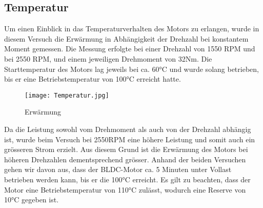 \subsection{Temperatur}\label{subsec:Temperatur}
Um einen Einblick in das Temperaturverhalten des Motors zu erlangen, wurde in diesem Versuch die Erwärmung in Abhängigkeit der Drehzahl bei konstantem Moment gemessen. Die Messung erfolgte bei einer Drehzahl von 1550 RPM und bei 2550 RPM, und einem jeweiligen Drehmoment von 32Nm. Die Starttemperatur des Motors lag jeweils bei ca. 60°C und wurde solang betrieben, bis er eine Betriebstemperatur von 100°C erreicht hatte.


\begin{figure}[H]
	\centering
	\texttt{[image: Temperatur.jpg]}
	\caption{Erwärmung}\label{fig:Temperatur}
\end{figure}


Da die Leistung sowohl vom Drehmoment als auch von der Drehzahl abhängig ist, wurde beim Versuch bei 2550RPM eine höhere Leistung und somit auch ein grösseren Strom erzielt. Aus diesem Grund ist die Erwärmung des Motors bei höheren Drehzahlen dementsprechend grösser. Anhand der beiden Versuchen gehen wir davon aus, dass der BLDC-Motor ca. 5 Minuten unter Vollast betrieben werden kann, bis er die 100°C erreicht. Es gilt zu beachten, dass der Motor eine Betriebstemperatur von 110°C zulässt, wodurch eine Reserve von 10°C gegeben ist.